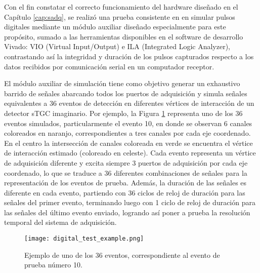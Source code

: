 Con el fin constatar el correcto funcionamiento del hardware diseñado en el Capítulo \ref{cap:sadq}, se realizó una prueba consistente en en simular pulsos digitales mediante un módulo auxiliar diseñado especialmente para este propósito, sumado a las herramientas disponibles en el software de desarrollo Vivado: VIO (Virtual Input/Output)\cite{XilinxVirtualSuite} e ILA (Integrated Logic Analyzer)\cite{XilinxIntegratedPG172}, contrastando así la integridad y duración de los pulsos capturados respecto a los datos recibidos por comunicación serial en un computador receptor.

El módulo auxiliar de simulación tiene como objetivo generar un exhaustivo barrido de señales abarcando todos los puertos de adquisición y simula señales equivalentes a 36 eventos de detección en diferentes vértices de interacción de un detector sTGC imaginario. Por ejemplo, la Figura \ref{img:digital_test_example} representa uno de los 36 eventos simulados, particularmente el evento 10, en donde se observan 6 canales coloreados en naranjo, correspondientes a tres canales por cada eje coordenado. En el centro la intersección de canales coloreada en verde se encuentra el vértice de interacción estimado (coloreado en celeste). Cada evento representa un vértice de adquisición diferente y excita siempre 3 puertos de adquisición por cada eje coordenado, lo que se traduce a 36 diferentes combinaciones de señales para la representación de los eventos de prueba. Además, la duración de las señales es diferente en cada evento, partiendo con 36 ciclos de reloj de duración para las señales del primer evento, terminando luego con 1 ciclo de reloj de duración para las señales del último evento enviado, logrando así poner a prueba la resolución temporal del sistema de adquisición.
	
	\begin{figure}[h]
		\centering
		\texttt{[image: digital\_test\_example.png]}
		\caption{Ejemplo de uno de los 36 eventos, correspondiente al evento de prueba número 10. }
		\label{img:digital_test_example}
	\end{figure}
	
